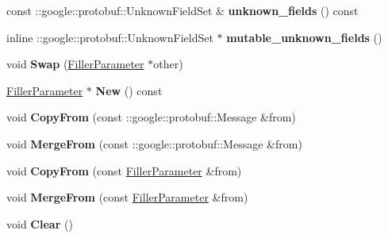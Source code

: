 \begin{DoxyCompactItemize}
const \+::google\+::protobuf\+::\+Unknown\+Field\+Set \& {\bfseries unknown\+\_\+fields} () const
\item 
\mbox{\label{classcaffe_1_1_filler_parameter_ab62aca76c584ad7ad5eab0d33388f8ca}} 
inline \+::google\+::protobuf\+::\+Unknown\+Field\+Set $\ast$ {\bfseries mutable\+\_\+unknown\+\_\+fields} ()
\item 
\mbox{\label{classcaffe_1_1_filler_parameter_a1f941b614d2e35bad69813dceb22b901}} 
void {\bfseries Swap} (\mbox{\hyperlink{classcaffe_1_1_filler_parameter}{Filler\+Parameter}} $\ast$other)
\item 
\mbox{\label{classcaffe_1_1_filler_parameter_ad3ec63aa259743e369596b078ff5e213}} 
\mbox{\hyperlink{classcaffe_1_1_filler_parameter}{Filler\+Parameter}} $\ast$ {\bfseries New} () const
\item 
\mbox{\label{classcaffe_1_1_filler_parameter_acfaf62f0120b58bf81fe6cd10e0eccf3}} 
void {\bfseries Copy\+From} (const \+::google\+::protobuf\+::\+Message \&from)
\item 
\mbox{\label{classcaffe_1_1_filler_parameter_a22f77190c252f60f8465433f3a4913dc}} 
void {\bfseries Merge\+From} (const \+::google\+::protobuf\+::\+Message \&from)
\item 
\mbox{\label{classcaffe_1_1_filler_parameter_a483c3add5432f3e53ebbed1c9aba43ba}} 
void {\bfseries Copy\+From} (const \mbox{\hyperlink{classcaffe_1_1_filler_parameter}{Filler\+Parameter}} \&from)
\item 
\mbox{\label{classcaffe_1_1_filler_parameter_af51ffc9dc0d090285894295423f9b967}} 
void {\bfseries Merge\+From} (const \mbox{\hyperlink{classcaffe_1_1_filler_parameter}{Filler\+Parameter}} \&from)
\item 
\mbox{\label{classcaffe_1_1_filler_parameter_ac0d9a7f72c87b111eded97a4b1674c45}} 
void {\bfseries Clear} ()
\item 
\mbox{\label{classcaffe_1_1_filler_parameter_acf315169e0a4d721188a39595375d13e}} 

\end{DoxyCompactItemize}
